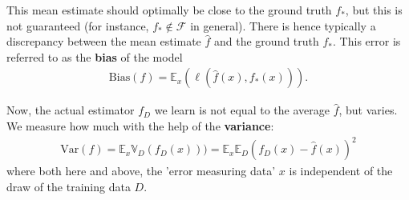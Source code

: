 \documentclass{article}
\newcommand{\calF}{\mathcal{F}}
\begin{document}
This mean estimate should optimally be close to the ground truth $f_*$, but this is not guaranteed (for instance, $f_*\notin \calF$ in general). There is hence typically a discrepancy between the mean estimate $\widehat{f}$ and the ground truth $f_*$. This error is referred to as the \textbf{bias} of the model
\begin{align*}
    \mathrm{Bias}(f) = \mathbb{E}_x(\ell(\widehat{f}(x),f_*(x))).
\end{align*}

Now, the actual estimator $f_D$ we learn is not equal to the average $\widehat{f}$, but varies. We measure how much with the help of the \textbf{variance}:
\begin{align*}
    \mathrm{Var}(f) = \mathbb{E}_x \mathbb{V}_D(f_D(x))) = \mathbb{E}_x \mathbb{E}_D(f_D(x)-\widehat{f}(x))^2
\end{align*}
where both here and above, the 'error measuring data' $x$ is independent of the draw of the training data $D$. 
\end{document}
